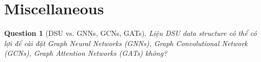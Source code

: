 \documentclass{article}
\newtheorem{question}{Question}
\begin{document}

\section{Miscellaneous}

\begin{question}[DSU vs. GNNs, GCNs, GATs]
    Liệu DSU data structure có thể có lợi để cài đặt Graph Neural Networks (GNNs), Graph Convolutional Network (GCNs), Graph Attention Networks (GATs) không?
\end{question}


\printbibliography[heading=bibintoc]
\end{document}
